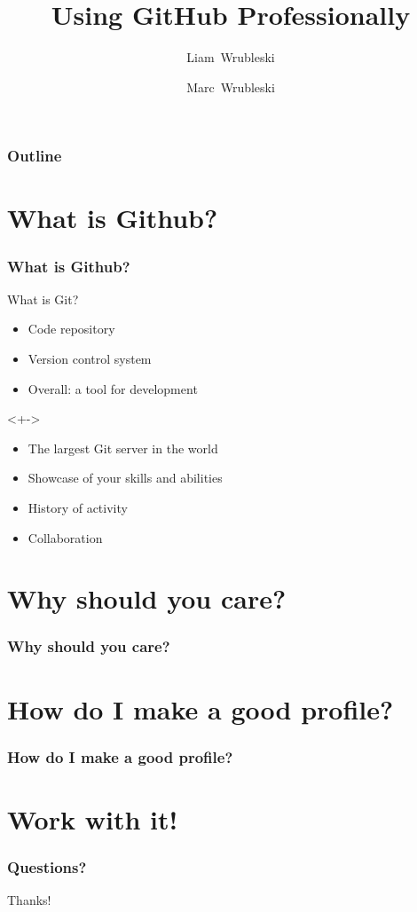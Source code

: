\documentclass{beamer}
\title[]{Using GitHub Professionally}
\author[]{Liam~Wrubleski\inst{1} \and Marc~Wrubleski\inst{2}}
\institute{
  \inst{1}%
  BSc. Electrical Engineering, BSc. Mathematics
  \and
  \inst{2}%
  Technical Manager at the Schulich School of Engineering %
}
\begin{document}
\begin{frame}[plain]
    \maketitle
\end{frame}

\begin{frame}
  \frametitle{Outline}
  \tableofcontents
\end{frame}
\section{What is Github?}
\begin{frame}
  \frametitle{What is Github?}
  What is Git?\pause
  \begin{itemize}[<+->]
    \item Code repository
    \item Version control system
    \item Overall: a tool for development
  \end{itemize}

  <+->
  \begin{itemize}[<+->]
  	\item The largest Git server in the world
  	\item Showcase of your skills and abilities
    \item History of activity
    \item Collaboration %
  \end{itemize}
\end{frame}
\section{Why should you care?}
\begin{frame}
  \frametitle{Why should you care?}
\end{frame}
\section{How do I make a good profile?}
\begin{frame}
  \frametitle{How do I make a good profile?}
\end{frame}
\section{Work with it!}
\begin{frame}
  \frametitle{Questions?}
\end{frame}

\begin{frame}[plain]
  Thanks!
\end{frame}
\end{document}
